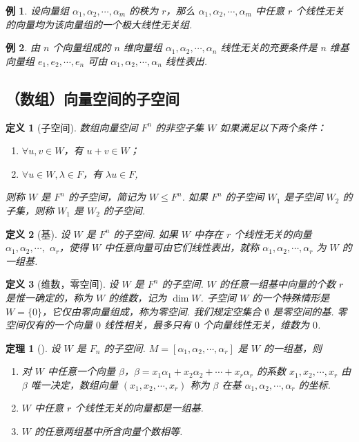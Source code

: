 \documentclass[zihao=-4,UTF8,linespread=1.8,nothm]{aytony_base}
\newtheorem{theorem}{\indent 定理}[subsection]
\newtheorem{definition}{\indent 定义}[subsection]
\newtheorem{example}{\indent 例}[subsection]
\begin{document}
\setcounter{example}{2}
\begin{example}
    设向量组 $\alpha_1, \alpha_2, \cdots, \alpha_m$ 的秩为 $r$，那么 $\alpha_1, \alpha_2, \cdots, \alpha_m$ 中任意 $r$ 个线性无关的向量均为该向量组的一个极大线性无关组.
\end{example}

\begin{example}
    由 $n$ 个向量组成的 $n$ 维向量组 $\alpha_1, \alpha_2, \cdots, \alpha_n$ 线性无关的充要条件是 $n$ 维基向量组 $e_1, e_2, \cdots, e_n$ 可由 $\alpha_1, \alpha_2, \cdots, \alpha_n$ 线性表出.
\end{example}

\subsection{（数组）向量空间的子空间}

\begin{definition}[子空间]
    数组向量空间 $F^n$ 的非空子集 $W$ 如果满足以下两个条件：
    \begin{enumerate}[nosep]
        \item $\forall u, v\in W$，有 $u+v \in W$；
        \item $\forall u \in W,\lambda \in F$，有 $\lambda u \in F$,
    \end{enumerate}
    则称 $W$ 是 $F^n$ 的子空间，简记为 $W \leqslant F^n$. 如果 $F^n$ 的子空间 $W_1$ 是子空间 $W_2$ 的子集，则称 $W_1$ 是 $W_2$ 的子空间.
\end{definition}

\begin{definition}[基]
    设 $W$ 是 $F^n$ 的子空间. 如果 $W$ 中存在 $r$ 个线性无关的向量 $\alpha_1, \alpha_2, \cdots,$ $\alpha_r$，使得 $W$ 中任意向量可由它们线性表出，就称 $\alpha_1, \alpha_2, \cdots, \alpha_r$ 为 $W$ 的一组基.
\end{definition}

\begin{definition}[维数，零空间]
    设 $W$ 是 $F^n$ 的子空间. $W$ 的任意一组基中向量的个数 $r$ 是惟一确定的，称为 $W$ 的维数，记为 $\dim W$. 子空间 $W$ 的一个特殊情形是 $W = \{0\}$，它仅由零向量组成，称为零空间. 我们规定空集合 $\emptyset$ 是零空间的基. 零空间仅有的一个向量 $0$ 线性相关，最多只有 $0$ 个向量线性无关，维数为 $0$.
\end{definition}

\begin{theorem}[]
    设 $W$ 是 $F_n$ 的子空间. $M = [\alpha_1, \alpha_2, \cdots, \alpha_r]$ 是 $W$ 的一组基，则
    \begin{enumerate}[nosep]
        \item 对 $W$ 中任意一个向量 $\beta$，$\beta = x_1\alpha_1+ x_2\alpha_2 + \cdots + x_r\alpha_r$ 的系数 $x_1, x_2, \cdots, x_r$ 由 $\beta$ 唯一决定，数组向量 $(x_1, x_2, \cdots, x_r)$ 称为 $\beta$ 在基 $\alpha_1, \alpha_2, \cdots, \alpha_r$ 的坐标.
        \item $W$ 中任意 $r$ 个线性无关的向量都是一组基.
        \item $W$ 的任意两组基中所含向量个数相等.
    \end{enumerate}
\end{theorem}
\end{document}
